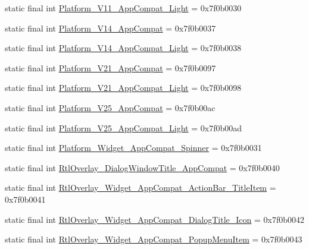 \begin{CompactItemize}
\item 
static final int \hyperlink{classandroid_1_1support_1_1v7_1_1appcompat_1_1_r_1_1style_31079a83e4ab1e091a40b4c2dde35ba9}{Platform\_\-V11\_\-AppCompat\_\-Light} = 0x7f0b0030
\item 
static final int \hyperlink{classandroid_1_1support_1_1v7_1_1appcompat_1_1_r_1_1style_ab0d99fe10b1c3cd43f1579bc92cd44c}{Platform\_\-V14\_\-AppCompat} = 0x7f0b0037
\item 
static final int \hyperlink{classandroid_1_1support_1_1v7_1_1appcompat_1_1_r_1_1style_0f04c871fb15b76b0bb7bd383f7a28ba}{Platform\_\-V14\_\-AppCompat\_\-Light} = 0x7f0b0038
\item 
static final int \hyperlink{classandroid_1_1support_1_1v7_1_1appcompat_1_1_r_1_1style_eab9879f7f95d66bdab616bb304dcf1b}{Platform\_\-V21\_\-AppCompat} = 0x7f0b0097
\item 
static final int \hyperlink{classandroid_1_1support_1_1v7_1_1appcompat_1_1_r_1_1style_2ef928c04fe675040d0313570c1c2042}{Platform\_\-V21\_\-AppCompat\_\-Light} = 0x7f0b0098
\item 
static final int \hyperlink{classandroid_1_1support_1_1v7_1_1appcompat_1_1_r_1_1style_d7e354c20537fc3eb2b060f86ce53a70}{Platform\_\-V25\_\-AppCompat} = 0x7f0b00ac
\item 
static final int \hyperlink{classandroid_1_1support_1_1v7_1_1appcompat_1_1_r_1_1style_bdfcf740c9a867001f5636facf68f439}{Platform\_\-V25\_\-AppCompat\_\-Light} = 0x7f0b00ad
\item 
static final int \hyperlink{classandroid_1_1support_1_1v7_1_1appcompat_1_1_r_1_1style_1487c97432173b0aa630a7614ae34d11}{Platform\_\-Widget\_\-AppCompat\_\-Spinner} = 0x7f0b0031
\item 
static final int \hyperlink{classandroid_1_1support_1_1v7_1_1appcompat_1_1_r_1_1style_ee92d1e0f37c44e4708ce18ef2fab65b}{RtlOverlay\_\-DialogWindowTitle\_\-AppCompat} = 0x7f0b0040
\item 
static final int \hyperlink{classandroid_1_1support_1_1v7_1_1appcompat_1_1_r_1_1style_9dad64e4f4ce1d4a613ee909ee3e1fc8}{RtlOverlay\_\-Widget\_\-AppCompat\_\-ActionBar\_\-TitleItem} = 0x7f0b0041
\item 
static final int \hyperlink{classandroid_1_1support_1_1v7_1_1appcompat_1_1_r_1_1style_2e777625ce86100f86a04d0ba1ecf54a}{RtlOverlay\_\-Widget\_\-AppCompat\_\-DialogTitle\_\-Icon} = 0x7f0b0042
\item 
static final int \hyperlink{classandroid_1_1support_1_1v7_1_1appcompat_1_1_r_1_1style_56554f74d058823098da6a4766fe19e9}{RtlOverlay\_\-Widget\_\-AppCompat\_\-PopupMenuItem} = 0x7f0b0043

\end{CompactItemize}
